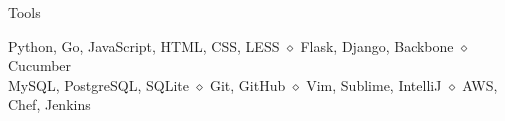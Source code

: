 \documentclass{resume} %
\begin{document}

\begin{rSection}{Tools}

Python, Go, JavaScript, HTML, CSS, LESS \enspace $\diamond$ \enspace Flask, Django, Backbone \enspace $\diamond$ \enspace Cucumber \\
MySQL, PostgreSQL, SQLite \enspace $\diamond$ \enspace Git, GitHub \enspace $\diamond$ \enspace Vim, Sublime, IntelliJ \enspace $\diamond$ \enspace AWS, Chef, Jenkins \smallskip

\end{rSection}








\end{document}
